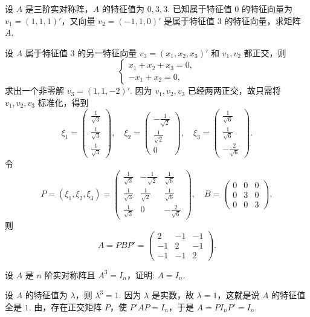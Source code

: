 \documentclass[../../main.tex]{subfiles}%
\begin{document}
\begin{example}
设 $A$ 是三阶实对称阵，$A$ 的特征值为 $0,3,3$. 已知属于特征值 $0$ 的特征向量为 $v_1 = (1,1,1)'$，又向量 $v_2 = (-1,1,0)'$ 是属于特征值 $3$ 的特征向量，求矩阵 $A$.
\end{example}
\begin{solution}
设 $A$ 属于特征值 $3$ 的另一特征向量 $v_3 = (x_1,x_2,x_3)'$ 和 $v_1,v_2$ 都正交，则
\[
\begin{cases}
x_1 + x_2 + x_3 = 0, \\
-x_1 + x_2 = 0,
\end{cases}
\]
求出一个非零解 $v_3 = (1,1,-2)'$. 因为 $v_1,v_2,v_3$ 已经两两正交，故只需将 $v_1,v_2,v_3$ 标准化，得到
\[
\xi_1 = 
\begin{pmatrix}
\frac{1}{\sqrt{3}} \\
\frac{1}{\sqrt{3}} \\
\frac{1}{\sqrt{3}}
\end{pmatrix}, \quad 
\xi_2 = 
\begin{pmatrix}
-\frac{1}{\sqrt{2}} \\
\frac{1}{\sqrt{2}} \\
0
\end{pmatrix}, \quad 
\xi_3 = 
\begin{pmatrix}
\frac{1}{\sqrt{6}} \\
\frac{1}{\sqrt{6}} \\
-\frac{2}{\sqrt{6}}
\end{pmatrix}.
\]
令
\[
P = (\xi_1,\xi_2,\xi_3) = 
\begin{pmatrix}
\frac{1}{\sqrt{3}} & -\frac{1}{\sqrt{2}} & \frac{1}{\sqrt{6}} \\
\frac{1}{\sqrt{3}} & \frac{1}{\sqrt{2}} & \frac{1}{\sqrt{6}} \\
\frac{1}{\sqrt{3}} & 0 & -\frac{2}{\sqrt{6}}
\end{pmatrix}, \quad 
B = 
\begin{pmatrix}
0 & 0 & 0 \\
0 & 3 & 0 \\
0 & 0 & 3
\end{pmatrix},
\]
则
\[
A = PBP' = 
\begin{pmatrix}
2 & -1 & -1 \\
-1 & 2 & -1 \\
-1 & -1 & 2
\end{pmatrix}.
\]

\end{solution}

\begin{example}
设 $A$ 是 $n$ 阶实对称阵且 $A^3 = I_n$，证明: $A = I_n$.
\end{example}
\begin{solution}
设 $A$ 的特征值为 $\lambda$，则 $\lambda^3 = 1$. 因为 $\lambda$ 是实数，故 $\lambda = 1$，这就是说 $A$ 的特征值全是 $1$. 由，存在正交矩阵 $P$，使 $P'AP = I_n$，于是 $A = PI_nP' = I_n$.

\end{solution}
\end{document}
